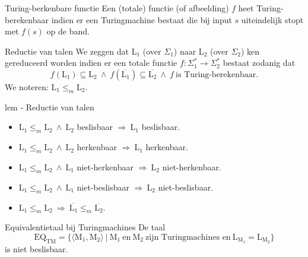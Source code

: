 \vspace{0.5cm}

\begin{theo}{Turing-berkenbare functie}
    Een (totale) functie (of afbeelding) $f$ heet Turing-berekenbaar indien er een Turingmachine bestaat die bij input $s$ uiteindelijk stopt met $f(s)$ op de band.
\end{theo}

\begin{theo}{Reductie van talen}
    We zeggen dat L$_1$ (over $\Sigma_1$) naar L$_2$ (over $\Sigma_2$) ken gereduceerd worden indien er een totale functie $f: \Sigma_1^* \to \Sigma_2^*$ bestaat zodanig dat
    \begin{equation*}
        f(\text{L}_1) \subseteq \text{L}_2 \ \land \ f(\overline{\text{L}_1}) \subseteq \overline{\text{L}_2} \ \land \ f \ \text{is Turing-berekenbaar}.
    \end{equation*}
    We noteren: $\text{L}_1 \leq_m \text{L}_2$.
\end{theo}

\newpage

\begin{lem}{lem - Reductie van talen}
    \begin{itemize}
        \item 
            $\text{L}_1 \leq_m \text{L}_2 \ \land \ \text{L}_2$ beslisbaar $\Rightarrow \ \text{L}_1$ beslisbaar.
        \item 
            $\text{L}_1 \leq_m \text{L}_2 \ \land \ \text{L}_2$ herkenbaar $\Rightarrow \ \text{L}_1$ herkenbaar.
        \item 
            $\text{L}_1 \leq_m \text{L}_2 \ \land \ \text{L}_1$ niet-herkenbaar $\Rightarrow \ \text{L}_2$ niet-herkenbaar.
        \item 
            $\text{L}_1 \leq_m \text{L}_2 \ \land \ \text{L}_1$ niet-beslisbaar $\Rightarrow \ \text{L}_2$ niet-beslisbaar.
        \item 
            $\text{L}_1 \leq_m \text{L}_2 \ \Rightarrow \ \overline{\text{L}_1} \leq_m \overline{\text{L}_2}$.
    \end{itemize}
\end{lem}

\begin{lem}{Equivalentietaal bij Turingmachines}
    De taal
    \begin{equation*}
        \text{EQ}_{\text{TM}} = \{\langle \text{M}_1, \text{M}_2 \rangle \ | \ \text{M}_1 \ \text{en} \ \text{M}_2 \ \text{zijn Turingmachines en} \ \text{L}_{\text{M}_1} = \text{L}_{\text{M}_2} \}
    \end{equation*}
    is niet beslisbaar.
\end{lem}

